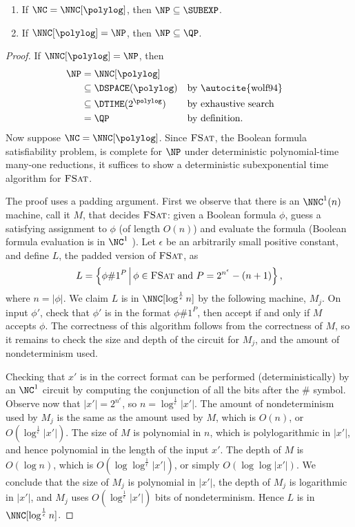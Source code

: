 \begin{theorem}\label{thm:npinqp}
  \mbox{}
  \begin{enumerate}
  \item If $\NC = \NNC[\polylog]$, then $\NP \subseteq \SUBEXP$.
  \item If $\NNC[\polylog] = \NP$, then $\NP \subseteq \QP$.
  \end{enumerate}
\end{theorem}
\begin{proof}
  If $\NNC[\polylog] = \NP$, then
  \begin{align*}
    \NP & = \NNC[\polylog] \\
        & \subseteq \DSPACE(\polylog) && \text{by \autocite{wolf94}} \\
        & \subseteq \DTIME(2^{\polylog}) && \text{by exhaustive search} \\
        & = \QP && \text{by definition}.
  \end{align*}
  Now suppose $\NC = \NNC[\polylog]$.
  Since $\textsc{FSat}$, the Boolean formula satisfiability problem, is complete for $\NP$ under deterministic polynomial-time many-one reductions, it suffices to show a deterministic subexponential time algorithm for $\textsc{FSat}$.

  The proof uses a padding argument.
  First we observe that there is an $\NNC^1(n)$ machine, call it $M$, that decides $\textsc{FSat}$: given a Boolean formula $\phi$, guess a satisfying assignment to $\phi$ (of length $O(n)$) and evaluate the formula (Boolean formula evaluation is in $\NC^1$ \autocite{buss87}).
  Let $\epsilon$ be an arbitrarily small positive constant, and define $L$, the padded version of $\textsc{FSat}$, as
  \begin{equation*}
    L = \left\{ \phi \# 1^P \, \middle| \, \phi \in \textsc{FSat} \text{ and } P = 2^{n^\epsilon} - (n + 1) \right\},
  \end{equation*}
  where $n = |\phi|$.
  We claim $L$ is in $\NNC[\log^\frac{1}{\epsilon} n]$ by the following machine, $M_j$.
  On input $\phi'$, check that $\phi'$ is in the format $\phi \# 1^P$, then accept if and only if $M$ accepts $\phi$.
  The correctness of this algorithm follows from the correctness of $M$, so it remains to check the size and depth of the circuit for $M_j$, and the amount of nondeterminism used.

  Checking that $x'$ is in the correct format can be performed (deterministically) by an $\NC^1$ circuit by computing the conjunction of all the bits after the $\#$ symbol.
  Observe now that $|x'| = 2^{n^\epsilon}$, so $n = \log^\frac{1}{\epsilon}{|x'|}$.
  The amount of nondeterminism used by $M_j$ is the same as the amount used by $M$, which is $O(n)$, or $O(\log^\frac{1}{\epsilon} |x'|)$.
  The size of $M$ is polynomial in $n$, which is polylogarithmic in $|x'|$, and hence polynomial in the length of the input $x'$.
  The depth of $M$ is $O(\log n)$, which is $O(\log \log^\frac{1}{\epsilon} |x'|)$, or simply $O(\log \log |x'|)$.
  We conclude that the size of $M_j$ is polynomial in $|x'|$, the depth of $M_j$ is logarithmic in $|x'|$, and $M_j$ uses $O(\log^\frac{1}{\epsilon} |x'|)$ bits of nondeterminism.
  Hence $L$ is in $\NNC[\log^\frac{1}{\epsilon} n]$.


\end{proof}
